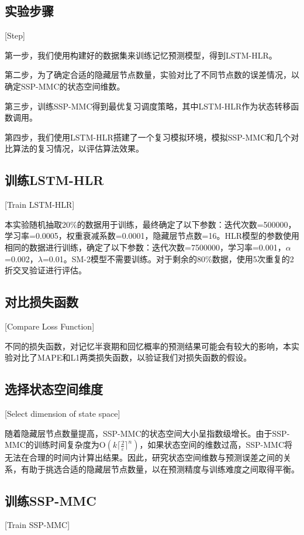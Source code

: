 \subsection{实验步骤}[Step]

第一步，我们使用构建好的数据集来训练记忆预测模型，得到LSTM-HLR。

第二步，为了确定合适的隐藏层节点数量，实验对比了不同节点数的误差情况，以确定SSP-MMC的状态空间维数。

第三步，训练SSP-MMC得到最优复习调度策略，其中LSTM-HLR作为状态转移函数调用。

第四步，我们使用LSTM-HLR搭建了一个复习模拟环境，模拟SSP-MMC和几个对比算法的复习情况，以评估算法效果。

\subsection{训练LSTM-HLR}[Train LSTM-HLR]

本实验随机抽取20\%的数据用于训练，最终确定了以下参数：迭代次数=500000，学习率=0.0005，权重衰减系数=0.0001，隐藏层节点数=16。HLR模型的参数使用相同的数据进行训练，确定了以下参数：迭代次数=7500000，学习率=0.001，$\alpha$=0.002，$\lambda$=0.01。SM-2模型不需要训练。对于剩余的80\%数据，使用5次重复的2折交叉验证\cite{dietterichApproximateStatisticalTests1998}进行评估。

\subsection{对比损失函数}[Compare Loss Function]

不同的损失函数，对记忆半衰期和回忆概率的预测结果可能会有较大的影响，本实验对比了MAPE和L1两类损失函数，以验证我们对损失函数的假设。

\subsection{选择状态空间维度}[Select dimension of state space]

随着隐藏层节点数量提高，SSP-MMC的状态空间大小呈指数级增长。由于SSP-MMC的训练时间复杂度为$\mathrm O(k\lceil\frac{2}{\varepsilon}\rceil^n)$，如果状态空间的维数过高，SSP-MMC将无法在合理的时间内计算出结果。因此，研究状态空间维数与预测误差之间的关系，有助于挑选合适的隐藏层节点数量，以在预测精度与训练难度之间取得平衡。

\subsection{训练SSP-MMC}[Train SSP-MMC]

